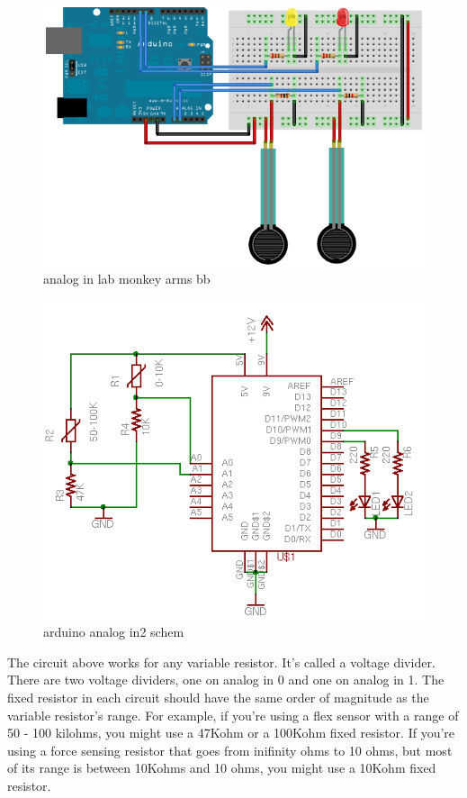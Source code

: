\begin{figure}[!htb]
 \centering
 \includegraphics[scale=0.6]{img/analogio/analog_in_lab_monkey_arms_bb.png}
 \caption{analog in lab monkey arms bb}
 \label{analog in lab monkey arms bb}
\end{figure}

\begin{figure}[!htb]
 \centering
 \includegraphics[scale=0.6]{img/analogio/arduino_analog_in2_schem.png}
 \caption{arduino analog in2 schem}
 \label{arduino analog in2 schem}
\end{figure}


The circuit above works for any variable resistor. It's called a voltage divider. There are two voltage dividers, one on analog in 0 and one on analog in 1. The fixed resistor in each circuit should have the same order of magnitude as the variable resistor's range. For example, if you're using a flex sensor with a range of 50 - 100 kilohms, you might use a 47Kohm or a 100Kohm fixed resistor. If you're using a force sensing resistor that goes from inifinity ohms to 10 ohms, but most of its range is between 10Kohms and 10 ohms, you might use a 10Kohm fixed resistor.

